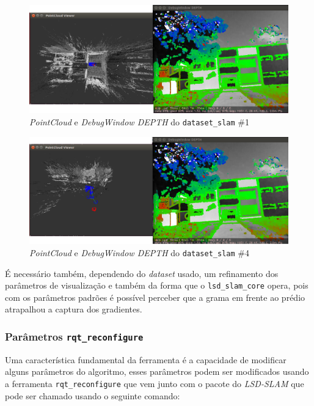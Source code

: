 \begin{figure}[!htb]
	\centering
		\includegraphics[width= \textwidth]{Imagens/figura3-26E3-27.png}
	\caption{\textit{PointCloud} e \textit{DebugWindow DEPTH} do \texttt{dataset\_slam} \#1}
	\label{fig3:26}
\end{figure}





\begin{figure}[!htb]
	\centering
		\includegraphics[width= \textwidth]{Imagens/figura3-28E3-29.png}
	\caption{\textit{PointCloud} e \textit{DebugWindow DEPTH} do \texttt{dataset\_slam} \#4}
	\label{fig3:27}
\end{figure}

É necessário também, dependendo do \textit{dataset} usado, um refinamento dos parâmetros de visualização e também da forma que o \texttt{lsd\_slam\_core} opera, pois com os parâmetros padrões é possível perceber que a grama em frente ao prédio atrapalhou a captura dos gradientes.

\subsubsection{Parâmetros \texttt{rqt\_reconfigure}}

Uma característica fundamental da ferramenta é a capacidade de modificar alguns parâmetros do algoritmo, esses parâmetros podem ser modificados usando a ferramenta \texttt{rqt\_reconfigure} que vem junto com o pacote do \textit{LSD-SLAM} que pode ser chamado usando o seguinte comando:

